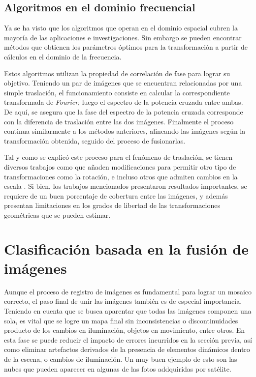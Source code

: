 \subsection*{Algoritmos en el dominio frecuencial}

Ya se ha visto que los algoritmos que operan en el dominio espacial cubren la mayoría de las aplicaciones e investigaciones. Sin embargo se pueden encontrar métodos que obtienen los parámetros óptimos para la transformación a partir de cálculos en el dominio de la frecuencia. 

Estos algoritmos utilizan la propiedad de correlación de fase para lograr su objetivo. Teniendo un par de imágenes que se encuentran relacionadas por una simple traslación, el funcionamiento consiste en calcular la correspondiente transformada de \textit{Fourier}, luego el espectro de la potencia cruzada entre ambas. De aquí, se asegura que la fase del espectro de la potencia cruzada corresponde con la diferencia de traslación entre las dos imágenes. Finalmente el proceso continua similarmente a los métodos anteriores, alineando las imágenes según la transformación obtenida, seguido del proceso de fusionarlas.

Tal y como se explicó este proceso para el fenómeno de traslación, se tienen diversos trabajos como \cite{phase-rot} que añaden modificaciones para permitir otro tipo de transformaciones como la rotación, e incluso otros que admiten cambios en la escala \cite{phase-scale}. Si bien, los trabajos mencionados presentaron resultados importantes, se requiere de un buen porcentaje de cobertura entre las imágenes, y además presentan limitaciones en los grados de libertad de las transformaciones geométricas que se pueden estimar.


\section*{Clasificación basada en la fusión de imágenes}

Aunque el proceso de registro de imágenes es fundamental para lograr un mosaico correcto, el paso final de unir las imágenes también es de especial importancia. Teniendo en cuenta que se busca aparentar que todas las imágenes componen una sola, es vital que se logre un mapa final sin inconsistencias o discontinuidades producto de los cambios en iluminación, objetos en movimiento, entre otros. En esta fase se puede reducir el impacto de errores incurridos en la sección previa, así como eliminar artefactos derivados de la presencia de elementos dinámicos dentro de la escena, o cambios de iluminación. Un muy buen ejemplo de esto son las nubes que pueden aparecer en algunas de las fotos addquiridas por satélite.

